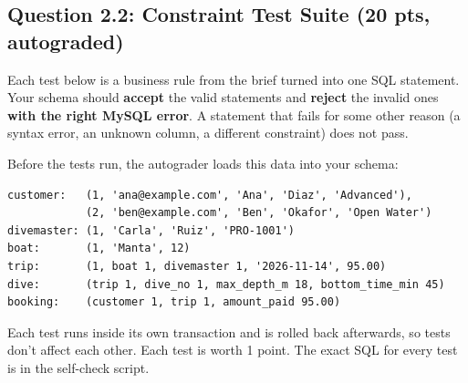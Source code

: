 \documentclass[11pt]{article}
\begin{document}
\subsection*{Question 2.2: Constraint Test Suite \hfill\textbf{(20 pts, autograded)}}

Each test below is a business rule from the brief turned into one SQL statement. Your schema should
\textbf{accept} the valid statements and \textbf{reject} the invalid ones \textbf{with the right
MySQL error}. A statement that fails for some other reason (a syntax error, an unknown column, a
different constraint) does not pass.

Before the tests run, the autograder loads this data into your schema:

\noindent\begin{minipage}{\linewidth}
\begin{lstlisting}
customer:   (1, 'ana@example.com', 'Ana', 'Diaz', 'Advanced'),
            (2, 'ben@example.com', 'Ben', 'Okafor', 'Open Water')
divemaster: (1, 'Carla', 'Ruiz', 'PRO-1001')
boat:       (1, 'Manta', 12)
trip:       (1, boat 1, divemaster 1, '2026-11-14', 95.00)
dive:       (trip 1, dive_no 1, max_depth_m 18, bottom_time_min 45)
booking:    (customer 1, trip 1, amount_paid 95.00)
\end{lstlisting}
\end{minipage}

Each test runs inside its own transaction and is rolled back afterwards, so tests don't affect each
other. Each test is worth 1 point. The exact SQL for every test is in the self-check script.
\end{document}
